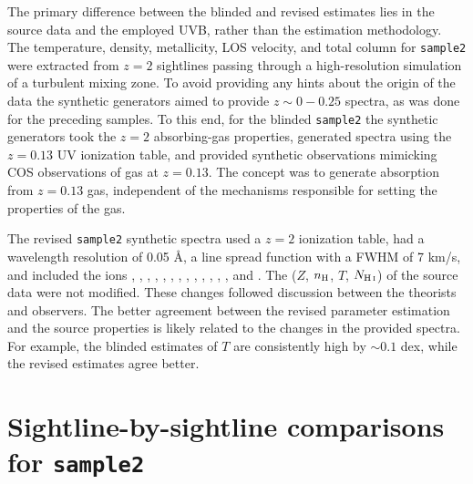 \documentclass[fleqn,usenatbib]{mnras}
\newcommand{\NHI}{N_{\ion{H}{I}}}
\begin{document}
The primary difference between the blinded and revised estimates lies in the source data and the employed UVB,
rather than the estimation methodology.
The temperature, density, metallicity, LOS velocity, and total column for \texttt{sample2} were extracted from $z=2$ sightlines passing through a high-resolution simulation of a turbulent mixing zone.
To avoid providing any hints about the origin of the data the synthetic generators aimed to provide $z \sim 0 - 0.25$ spectra,
as was done for the preceding samples.
To this end, for the blinded \texttt{sample2} the synthetic generators took the $z=2$ absorbing-gas properties,
generated spectra using the $z=0.13$ UV ionization table,
and provided synthetic observations mimicking COS observations of gas at $z=0.13$.
The concept was to generate absorption from $z=0.13$ gas,
independent of the mechanisms responsible for setting the properties of the gas.

The revised \texttt{sample2} synthetic spectra used a $z=2$ ionization table,
had a wavelength resolution of 0.05 \AA,
a line spread function with a FWHM of 7 km/s,
and included the ions , , , , , , , , , , , , , and .
The ($Z$, $n_{\rm H}$, $T$, $\NHI$) of the source data were not modified.
These changes followed discussion between the theorists and observers.
The better agreement between the revised parameter estimation and the source properties is likely related to the changes in the provided spectra.
For example, the blinded estimates of $T$ are consistently high by $\sim 0.1$ dex,
while the revised estimates agree better.

\section{Sightline-by-sightline comparisons for \texttt{sample2}}
\label{a: all sightlines for sample2}
\end{document}
